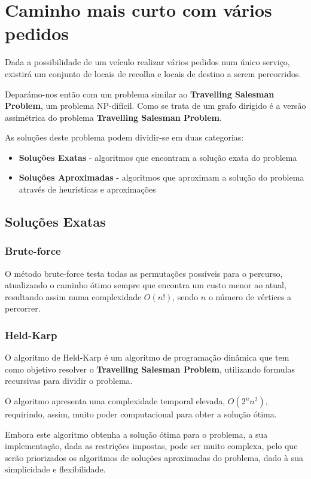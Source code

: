 \documentclass[article, a4paper, 12pt, oneside]{memoir}
\begin{document}
\newpage
\section{Caminho mais curto com vários pedidos}
Dada a possibilidade de um veículo realizar vários pedidos num único serviço, existirá um conjunto de locais de recolha e locais de destino a serem percorridos.

Deparámo-nos então com um problema similar ao \textbf{Travelling Salesman Problem}, um problema NP-difícil. Como se trata de um grafo dirigido é a versão assimétrica do problema \textbf{Travelling Salesman Problem}.

As soluções deste problema podem dividir-se em duas categorias:
\begin{itemize}
	\item \textbf{Soluções Exatas} - algoritmos que encontram a solução exata do problema
	\item \textbf{Soluções Aproximadas} - algoritmos que aproximam a solução do problema através de heurísticas e aproximações
\end{itemize}

\subsection{Soluções Exatas}
\subsubsection{Brute-force}
O método brute-force testa todas as permutações possíveis para o percurso, atualizando o caminho ótimo sempre que encontra um custo menor ao atual, resultando assim numa complexidade $O(n!)$, sendo $n$ o número de vértices a percorrer.

\subsubsection{Held-Karp}
O algoritmo de Held-Karp é um algoritmo de programação dinâmica que tem como objetivo resolver o \textbf{Travelling Salesman Problem}, utilizando formulas recursivas para dividir o problema.

O algoritmo apresenta uma complexidade temporal elevada, $O(2^nn^2)$, requirindo, assim, muito poder computacional para obter a solução ótima.

Embora este algoritmo obtenha a solução ótima para o problema, a sua implementação, dada as restrições impostas, pode ser muito complexa, pelo que serão priorizados os algoritmos de soluções aproximadas do problema, dado à sua simplicidade e flexibilidade.
\end{document}
